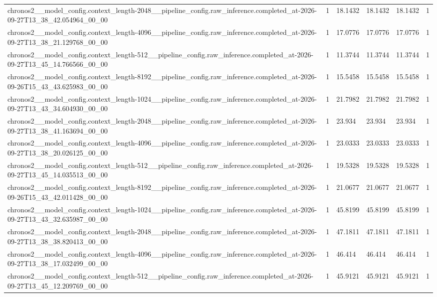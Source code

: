 \begin{tabular}{llllll}
chronos2\_\_model\_config.context\_length-2048\_\_pipeline\_config.raw\_inference.completed\_at-2026-09-27T13\_38\_42.054964\_00\_00 & 1 & 18.1432 & 18.1432 & 18.1432 & 1 \\
chronos2\_\_model\_config.context\_length-4096\_\_pipeline\_config.raw\_inference.completed\_at-2026-09-27T13\_38\_21.129768\_00\_00 & 1 & 17.0776 & 17.0776 & 17.0776 & 1 \\
chronos2\_\_model\_config.context\_length-512\_\_pipeline\_config.raw\_inference.completed\_at-2026-09-27T13\_45\_14.766566\_00\_00 & 1 & 11.3744 & 11.3744 & 11.3744 & 1 \\
chronos2\_\_model\_config.context\_length-8192\_\_pipeline\_config.raw\_inference.completed\_at-2026-09-26T15\_43\_43.625983\_00\_00 & 1 & 15.5458 & 15.5458 & 15.5458 & 1 \\
chronos2\_\_model\_config.context\_length-1024\_\_pipeline\_config.raw\_inference.completed\_at-2026-09-27T13\_43\_34.604930\_00\_00 & 1 & 21.7982 & 21.7982 & 21.7982 & 1 \\
chronos2\_\_model\_config.context\_length-2048\_\_pipeline\_config.raw\_inference.completed\_at-2026-09-27T13\_38\_41.163694\_00\_00 & 1 & 23.934 & 23.934 & 23.934 & 1 \\
chronos2\_\_model\_config.context\_length-4096\_\_pipeline\_config.raw\_inference.completed\_at-2026-09-27T13\_38\_20.026125\_00\_00 & 1 & 23.0333 & 23.0333 & 23.0333 & 1 \\
chronos2\_\_model\_config.context\_length-512\_\_pipeline\_config.raw\_inference.completed\_at-2026-09-27T13\_45\_14.035513\_00\_00 & 1 & 19.5328 & 19.5328 & 19.5328 & 1 \\
chronos2\_\_model\_config.context\_length-8192\_\_pipeline\_config.raw\_inference.completed\_at-2026-09-26T15\_43\_42.011428\_00\_00 & 1 & 21.0677 & 21.0677 & 21.0677 & 1 \\
chronos2\_\_model\_config.context\_length-1024\_\_pipeline\_config.raw\_inference.completed\_at-2026-09-27T13\_43\_32.635987\_00\_00 & 1 & 45.8199 & 45.8199 & 45.8199 & 1 \\
chronos2\_\_model\_config.context\_length-2048\_\_pipeline\_config.raw\_inference.completed\_at-2026-09-27T13\_38\_38.820413\_00\_00 & 1 & 47.1811 & 47.1811 & 47.1811 & 1 \\
chronos2\_\_model\_config.context\_length-4096\_\_pipeline\_config.raw\_inference.completed\_at-2026-09-27T13\_38\_17.032499\_00\_00 & 1 & 46.414 & 46.414 & 46.414 & 1 \\
chronos2\_\_model\_config.context\_length-512\_\_pipeline\_config.raw\_inference.completed\_at-2026-09-27T13\_45\_12.209769\_00\_00 & 1 & 45.9121 & 45.9121 & 45.9121 & 1 \\

\end{tabular}
